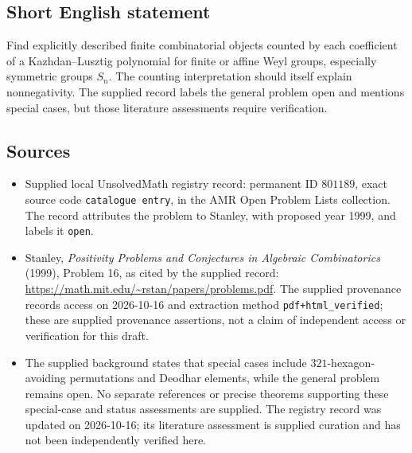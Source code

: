 \documentclass[11pt]{article}
\begin{document}
\subsection{Short English statement}
Find explicitly described finite combinatorial objects counted by each coefficient of a Kazhdan--Lusztig polynomial for finite or affine Weyl groups, especially symmetric groups \(S_n\). The counting interpretation should itself explain nonnegativity. The supplied record labels the general problem open and mentions special cases, but those literature assessments require verification.
\subsection{Sources}
\begin{itemize}
\item Supplied local UnsolvedMath registry record: permanent ID \(801189\), exact source code \texttt{catalogue entry}, in the AMR Open Problem Lists collection. The record attributes the problem to Stanley, with proposed year 1999, and labels it \texttt{open}.
\item Stanley, \emph{Positivity Problems and Conjectures in Algebraic Combinatorics} (1999), Problem 16, as cited by the supplied record: \url{https://math.mit.edu/~rstan/papers/problems.pdf}. The supplied provenance records access on 2026-10-16 and extraction method \texttt{pdf+html\_verified}; these are supplied provenance assertions, not a claim of independent access or verification for this draft.
\item The supplied background states that special cases include \(321\)-hexagon-avoiding permutations and Deodhar elements, while the general problem remains open. No separate references or precise theorems supporting these special-case and status assessments are supplied. The registry record was updated on 2026-10-16; its literature assessment is supplied curation and has not been independently verified here.
\end{itemize}
\end{document}
